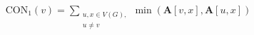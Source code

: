 \documentclass[preview]{standalone}
\begin{document}
\begin{align*}
\text{CON}_{1}(v) = \sum_{\substack{u, x \in V(G), \\ u \neq v}} \min(\mathbf{A}[v, x], \mathbf{A}[u, x])
\end{align*}
\end{document}
